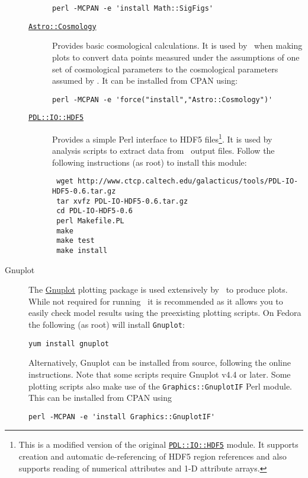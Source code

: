\begin{description}
\begin{description}
\begin{verbatim}
perl -MCPAN -e 'install Math::SigFigs'
\end{verbatim}
  \item [\href{http://search.cpan.org/~djburke/Astro-Cosmology-0.90/Cosmology.pm}{{\tt Astro::Cosmology}}] Provides basic cosmological calculations. It is used by \glc\ when making plots to convert data points measured under the assumptions of one set of cosmological parameters to the cosmological parameters assumed by \glc. It can be installed from CPAN using:
\begin{verbatim}
perl -MCPAN -e 'force("install","Astro::Cosmology")'
\end{verbatim}
  \item [\href{http://www.ctcp.caltech.edu/galacticus/tools/PDL-IO-HDF5-0.6.tar.gz}{{\tt PDL::IO::HDF5}}] Provides a simple Perl interface to HDF5 files\footnote{This is a modified version of the  original \protect\href{http://search.cpan.org/~cerney/PDL-IO-HDF5-0.6/}{{\tt PDL::IO::HDF5}} module. It supports creation and automatic de-referencing of HDF5 region references and also supports reading of numerical attributes and 1-D attribute arrays.}. It is used by analysis scripts to extract data from \glc\ output files. Follow the following instructions (as root) to install this module:
\begin{verbatim}
 wget http://www.ctcp.caltech.edu/galacticus/tools/PDL-IO-HDF5-0.6.tar.gz
 tar xvfz PDL-IO-HDF5-0.6.tar.gz
 cd PDL-IO-HDF5-0.6
 perl Makefile.PL
 make
 make test
 make install
\end{verbatim}
\end{description}

\item[Gnuplot] The \href{http://www.gnuplot.info/}{\sc Gnuplot} plotting package is used extensively by \glc\ to produce plots. While not required for running \glc\ it is recommended as it allows you to easily check model results using the preexisting plotting scripts. On Fedora the following (as root) will install {\tt Gnuplot}:
\begin{verbatim}
yum install gnuplot
\end{verbatim}
Alternatively, {\sc Gnuplot} can be installed from source, following the online instructions. Note that some scripts require {\sc Gnuplot} v4.4 or later. Some plotting scripts also make use of the {\tt Graphics::GnuplotIF} Perl module. This can be installed from CPAN using
\begin{verbatim}
perl -MCPAN -e 'install Graphics::GnuplotIF'
\end{verbatim}


\end{description}

